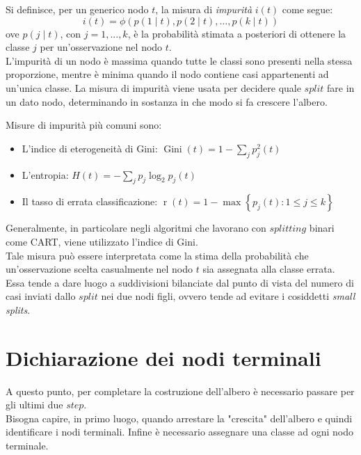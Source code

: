 Si definisce, per un generico nodo $t$, la misura di \textit{impurità} $i(t)$ come segue:
\begin{equation}
i(t)=\phi(p(1 \mid t), p(2 \mid t), \ldots, p(k \mid t))
\label{eq:impurity}
\end{equation}
ove $p(j \mid t)$, con $j=1,...,k$, è la probabilità stimata a posteriori di ottenere la classe $j$ per un'osservazione nel nodo $t$.\\
L’impurità di un nodo è massima quando tutte le classi sono presenti nella stessa proporzione, mentre è minima quando il nodo contiene casi appartenenti ad un’unica classe. La misura di impurità viene usata per decidere quale $split$ fare in un dato nodo, determinando in sostanza in che modo si fa crescere l'albero.

Misure di impurità più comuni sono:
\begin{itemize}
    \item L'indice di eterogeneità di Gini: $\operatorname{Gini}(t)=1-\sum_{j} p_{j}^{2}(t)$
    \item L'entropia: $H(t)=-\sum_{j} p_{j} \log _{2} p_{j}(t)$
    \item Il tasso di errata classificazione: $\operatorname{r}(t)=1-\max \left\{p_{j}(t): 1 \leq j \leq k \right\}$
\end{itemize}


Generalmente, in particolare negli algoritmi che lavorano con $splitting$ binari come CART, viene utilizzato l'indice di Gini.\\
Tale misura può essere interpretata come la stima della probabilità che un’osservazione scelta casualmente nel nodo $t$ sia assegnata alla classe errata.\\
Essa tende a dare luogo a suddivisioni bilanciate dal punto di vista del numero di casi inviati dallo $split$ nei due nodi figli, ovvero tende ad evitare i cosiddetti \textit{small splits}.

\section{Dichiarazione dei nodi terminali}
A questo punto, per completare la costruzione dell'albero è necessario passare per gli ultimi due $step$.\\ 
Bisogna capire, in primo luogo, quando arrestare la "crescita" dell'albero e quindi identificare i nodi terminali. Infine è necessario assegnare una classe ad ogni nodo terminale.  


